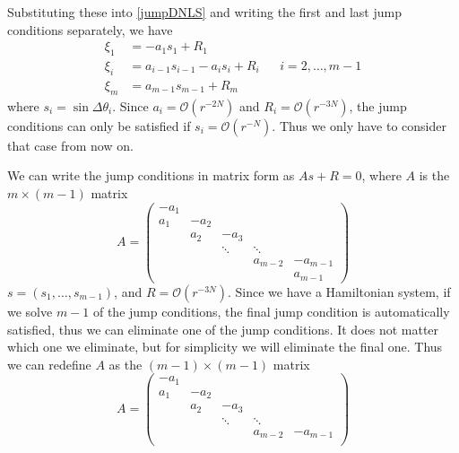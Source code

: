 \documentclass[12pt]{article}
\begin{document}
Substituting these into \eqref{jumpDNLS} and writing the first and last jump conditions separately, we have
\begin{equation}\label{jumpDNLS2}
\begin{aligned}
\xi_1 &= -a_1 s_1 + R_1 \\
\xi_i &= a_{i-1} s_{i-1} - a_i s_i + R_i
&& i = 2, \dots, m-1 \\
\xi_m &= a_{m-1} s_{m-1} + R_m
\end{aligned}
\end{equation}
where $s_i = \sin{\Delta\theta_i}$. Since $a_i = \mathcal{O}(r^{-2N})$ and $R_i = \mathcal{O}(r^{-3N})$, the jump conditions can only be satisfied if $s_i = \mathcal{O}(r^{-N})$. Thus we only have to consider that case from now on. 

We can write the jump conditions in matrix form as $A s + R = 0$, where $A$ is the $m \times (m-1)$ matrix
\[
A = \begin{pmatrix}
-a_1 \\
a_1 & -a_2 \\
& a_2 & -a_3 \\
&& \ddots & \ddots \\
&&& a_{m-2} & -a_{m-1} \\
&&&& a_{m-1}
\end{pmatrix}
\]
$s = (s_1, \dots, s_{m-1})$, and $R = \mathcal{O}(r^{-3N})$. Since we have a Hamiltonian system, if we solve $m-1$ of the jump conditions, the final jump condition is automatically satisfied, thus we can eliminate one of the jump conditions. It does not matter which one we eliminate, but for simplicity we will eliminate the final one. Thus we can redefine $A$ as the $(m-1)\times(m-1)$ matrix
\[
A = \begin{pmatrix}
-a_1 \\
a_1 & -a_2 \\
& a_2 & -a_3 \\
&& \ddots & \ddots \\
&&& a_{m-2} & -a_{m-1} \\
\end{pmatrix}
\]
\end{document}
